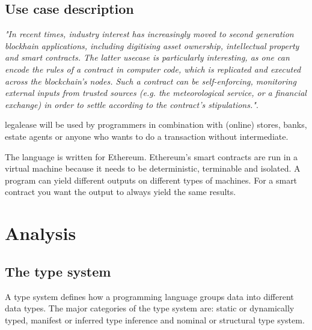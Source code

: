 \documentclass{uva-inf-article}
\begin{document}
\subsection{Use case description}
\textit{"In recent times, industry interest has increasingly moved to second generation blockhain applications, 
including digitising asset ownership, intellectual property and smart contracts. The latter usecase is particularly interesting, 
as one can encode the rules of a contract in computer code, which is replicated and executed across the blockchain’s nodes. 
Such a contract can be self-enforcing, monitoring external inputs from trusted sources (e.g. the meteorological service, or a financial exchange) in 
order to settle according to the contract’s stipulations."}\cite{Peters2016}.
\vspace{5mm}

\par legalease will be used by programmers in combination with (online) stores, banks, estate agents or anyone 
who wants to do a transaction without intermediate.
\vspace{5mm}

\par The language is written for Ethereum. Ethereum's smart contracts are run in a virtual machine because 
it needs to be deterministic, terminable and isolated.
A program can yield different outputs on different types of machines.
For a smart contract you want the output to always yield the same results.

\newpage
\section{Analysis}
\subsection{The type system}
\par A type system defines how a programming language groups data into different data types.
The major categories of the type system are: static or dynamically typed, manifest or inferred 
type inference and nominal or structural type system.
\vspace{5mm}
\end{document}
